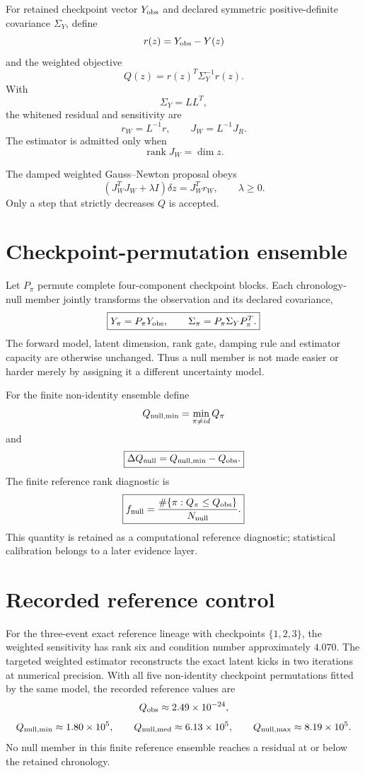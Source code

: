 \documentclass[11pt]{book}
\begin{document}
For retained checkpoint vector $Y_{\rm obs}$ and declared symmetric positive-definite covariance $\Sigma_Y$, define
\[
r(z)=Y_{\rm obs}-Y(z)
\]
and the weighted objective
\[
\boxed{
Q(z)=r(z)^T\Sigma_Y^{-1}r(z).
}
\]
With
\[
\Sigma_Y=LL^T,
\]
the whitened residual and sensitivity are
\[
r_W=L^{-1}r,
\qquad
J_W=L^{-1}J_R.
\]
The estimator is admitted only when
\[
\boxed{\operatorname{rank}J_W=\dim z.}
\]

The damped weighted Gauss--Newton proposal obeys
\[
\boxed{
(J_W^TJ_W+\lambda I)\delta z=J_W^Tr_W,
\qquad \lambda\ge0.
}
\]
Only a step that strictly decreases $Q$ is accepted.

\section{Checkpoint-permutation ensemble}

Let $P_\pi$ permute complete four-component checkpoint blocks. Each chronology-null member jointly transforms the observation and its declared covariance,
\[
\boxed{
Y_\pi=P_\pi Y_{\rm obs},
\qquad
\Sigma_\pi=P_\pi\Sigma_YP_\pi^T.
}
\]
The forward model, latent dimension, rank gate, damping rule and estimator capacity are otherwise unchanged. Thus a null member is not made easier or harder merely by assigning it a different uncertainty model.

For the finite non-identity ensemble define
\[
Q_{\rm null,min}=\min_{\pi\ne id}Q_\pi
\]
and
\[
\boxed{
\Delta Q_{\rm null}=Q_{\rm null,min}-Q_{\rm obs}.
}
\]
The finite reference rank diagnostic is
\[
\boxed{
f_{\rm null}=\frac{\#\{\pi:Q_\pi\le Q_{\rm obs}\}}{N_{\rm null}}.
}
\]
This quantity is retained as a computational reference diagnostic; statistical calibration belongs to a later evidence layer.

\section{Recorded reference control}

For the three-event exact reference lineage with checkpoints $\{1,2,3\}$, the weighted sensitivity has rank six and condition number approximately $4.070$. The targeted weighted estimator reconstructs the exact latent kicks in two iterations at numerical precision. With all five non-identity checkpoint permutations fitted by the same model, the recorded reference values are
\[
Q_{\rm obs}\approx2.49\times10^{-24},
\]
\[
Q_{\rm null,min}\approx1.80\times10^5,
\qquad
Q_{\rm null,med}\approx6.13\times10^5,
\qquad
Q_{\rm null,max}\approx8.19\times10^5.
\]
No null member in this finite reference ensemble reaches a residual at or below the retained chronology.
\end{document}

